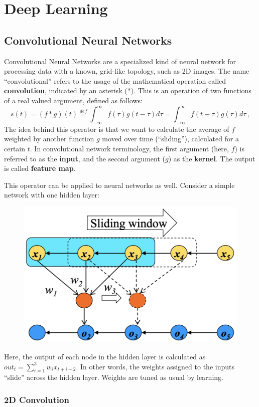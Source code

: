 \chapter{Deep Learning}

\section{Convolutional Neural Networks}

Convolutional Neural Networks are a specialized kind of neural network for processing data with a known, grid-like topology, such as 2D images. The name ``convolutional'' refers to the usage of the mathematical operation called \textbf{convolution}, indicated by an asterisk ($*$). This is an operation of two functions of a real valued argument, defined as follows:
\begin{equation*}
    s(t) = (f * g)(t) \stackrel{def}{=} \int_{-\infty}^{\infty} f(\tau)g(t - \tau) d \tau = \int_{-\infty}^{\infty} f(t - \tau)g(\tau) d\tau \,,
\end{equation*}
The idea behind this operator is that we want to calculate the average of $f$ weighted by another function $g$ moved over time (``sliding''), calculated for a certain $t$. In convolutional network terminology, the first argument (here, $f$) is referred to as the \textbf{input}, and the second argument ($g$) as the \textbf{kernel}. The output is called \textbf{feature map}.

This operator can be applied to neural networks as well. Consider a simple network with one hidden layer:
\begin{figure}[ht]
    \centering
    \includegraphics[width=0.45\linewidth]{img/CNN_simple.png}
\end{figure}

Here, the output of each node in the hidden layer is calculated as $out_t = \sum_{i=1}^3 w_i x_{t+i-2}$. In other words, the weights assigned to the inputs ``slide'' across the hidden layer. Weights are tuned as usual by learning.

\subsection{2D Convolution}

